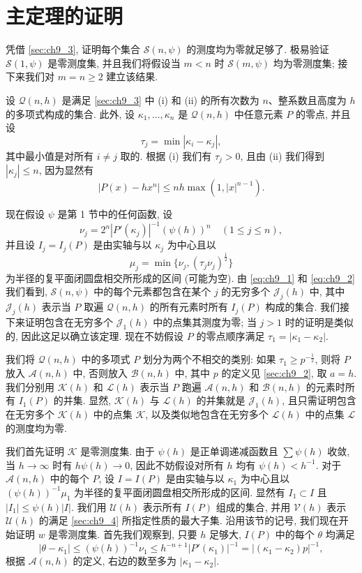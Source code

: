 \section{主定理的证明}\label{sec:ch9_5}

凭借 \autoref{sec:ch9_3}, 证明每个集合 $\mathscr{S}(n, \psi)$ 的测度均为零就足够了. 极易验证 $\mathscr{S}(1, \psi)$ 是零测度集, 并且我们将假设当 $m < n$ 时 $\mathscr{S}(m, \psi)$ 均为零测度集; 接下来我们对 $m = n \ge 2$ 建立该结果.

设 $\mathscr{Q}(n,h)$ 是满足 \autoref{sec:ch9_3} 中 (i) 和 (ii) 的所有次数为 $n$、整系数且高度为 $h$ 的多项式构成的集合. 此外, 设 $\kappa_1, \ldots, \kappa_n$ 是 $\mathscr{Q}(n,h)$ 中任意元素 $P$ 的零点, 并且设
\[\tau_j = \min |\kappa_i - \kappa_j|,\]
其中最小值是对所有 $i \neq j$ 取的. 根据 (i) 我们有 $\tau_j > 0$, 且由 (ii) 我们得到 $|\kappa_j| \leq n$, 因为显然有
\[|P(x)-hx^n|\leqslant nh\max(1,|x|^{n-1}).\]

现在假设 $\psi$ 是第 1 节中的任何函数, 设
\[\nu_j=2^n\left|P'(\kappa_j)\right|^{-1}(\psi(h))^n\quad (1\leqslant j\leqslant n),\]
并且设 $I_j = I_j(P)$ 是由实轴与以 $\kappa_j$ 为中心且以
\[\mu_j = \min \{ \nu_j, (\tau_j \nu_j)^{\frac{1}{2}} \} \]
为半径的复平面闭圆盘相交所形成的区间 (可能为空). 由 \eqref{eq:ch9_1} 和 \eqref{eq:ch9_2} 我们看到, $\mathscr{S}(n,\psi)$ 中的每个元素都包含在某个 $j$ 的无穷多个 $\mathscr{J}_j(h)$ 中, 其中 $\mathscr{J}_j(h)$ 表示当 $P$ 取遍 $\mathscr{Q}(n,h)$ 的所有元素时所有 $I_j(P)$ 构成的集合. 我们接下来证明包含在无穷多个 $\mathscr{J}_1(h)$ 中的点集其测度为零; 当 $j > 1$ 时的证明是类似的, 因此这足以确立该定理. 现在不妨假设 $P$ 的零点顺序满足 $\tau_1 = |\kappa_1 - \kappa_2|$.

我们将 $\mathscr{Q}(n,h)$ 中的多项式 $P$ 划分为两个不相交的类别: 如果 $\tau_1 \geq p^{-\frac{1}{2}}$, 则将 $P$ 放入 $\mathscr{A}(n,h)$ 中, 否则放入 $\mathscr{B}(n,h)$ 中, 其中 $p$ 的定义见 \autoref{sec:ch9_2}, 取 $a=h$. 我们分别用 $\mathscr{K}(h)$ 和 $\mathscr{L}(h)$ 表示当 $P$ 跑遍 $\mathscr{A}(n,h)$ 和 $\mathscr{B}(n,h)$ 的元素时所有 $I_1(P)$ 的并集. 显然, $\mathscr{K}(h)$ 与 $\mathscr{L}(h)$ 的并集就是 $\mathscr{J}_1(h)$, 且只需证明包含在无穷多个 $\mathscr{K}(h)$ 中的点集 $\mathscr{K}$, 以及类似地包含在无穷多个 $\mathscr{L}(h)$ 中的点集 $\mathscr{L}$ 的测度均为零.

我们首先证明 $\mathscr{K}$ 是零测度集. 由于 $\psi(h)$ 是正单调递减函数且 $\sum \psi(h)$ 收敛, 当 $h \to \infty$ 时有 $h\psi(h) \to 0$, 因此不妨假设对所有 $h$ 均有 $\psi(h) < h^{-1}$. 对于 $\mathscr{A}(n,h)$ 中的每个 $P$, 设 $I=I(P)$ 是由实轴与以 $\kappa_1$ 为中心且以 $(\psi(h))^{-1}\mu_1$ 为半径的复平面闭圆盘相交所形成的区间. 显然有 $I_1 \subset I$ 且 $|I_1| \leq \psi(h) |I|$. 我们用 $\mathscr{U}(h)$ 表示所有 $I(P)$ 组成的集合, 并用 $\mathscr{V}(h)$ 表示 $\mathscr{U}(h)$ 的满足 \autoref{sec:ch9_4} 所指定性质的最大子集. 沿用该节的记号, 我们现在开始证明 $w$ 是零测度集. 首先我们观察到, 只要 $h$ 足够大, $I(P)$ 中的每个 $\theta$ 均满足
\[\left|\theta - \kappa_{1}\right| \leq (\psi(h))^{-1} \nu_{1} \leq h^{-n+1} |P'(\kappa_{1})|^{-1} = \left|(\kappa_{1} - \kappa_{2}) p\right|^{-1}, \tag{7}\label{eq:ch9_7}\]
根据 $\mathscr{A}(n, h)$ 的定义, 右边的数至多为 $|\kappa_1 - \kappa_2|$.

